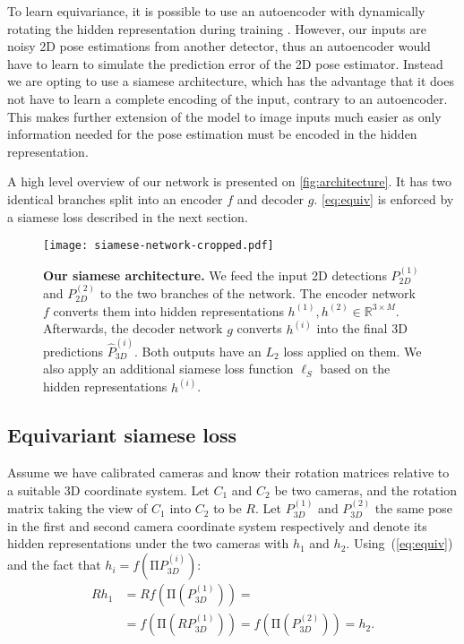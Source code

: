 \documentclass[preprint]{elsarticle}
\begin{document}
To learn equivariance, it is possible to use an autoencoder with dynamically rotating the hidden representation during training \cite{helge_geometry-aware}. However, our inputs are noisy 2D pose estimations from another detector, thus an autoencoder would have to learn to simulate the prediction error of the 2D pose estimator. Instead we are opting to use a siamese architecture, which has the advantage that it does not have to learn a complete encoding of the input, contrary to an autoencoder. This makes further extension of the model to image inputs much easier as only information needed for the pose estimation must be encoded in the hidden representation. 

A high level overview of our network is presented on \autoref{fig:architecture}. It has two identical branches split into an encoder $f$ and decoder $g$. \autoref{eq:equiv} is enforced by a siamese loss described in the next section. 

\begin{figure}[ht]
    \centering
    \texttt{[image: siamese-network-cropped.pdf]}
    \caption{\textbf{Our siamese architecture.} We feed the input 2D detections $P_{2D}^{(1)}$ and $P_{2D}^{(2)}$ to the two branches of the network. The encoder network $f$ converts them into hidden representations $h^{(1)},h^{(2)}\in\mathbb{R}^{3\times M}$. Afterwards, the decoder network $g$ converts $h^{(i)}$ into the final 3D predictions $\hat{P}_{3D}^{(i)}$. Both outputs have an $L_2$ loss applied on them. We also apply an additional siamese loss function $\ell_S$ based on the hidden representations $h^{(i)}$.}
    \label{fig:architecture}
\end{figure}

\subsection{Equivariant siamese loss}
Assume we have calibrated cameras and know their rotation matrices relative to a suitable 3D coordinate system. Let $C_1$ and $C_2$ be two cameras, and the rotation matrix taking the view of $C_1$ into $C_2$ to be $R$. Let $P_{3D}^{(1)}$ and $P_{3D}^{(2)}$ the same pose in the first and second camera coordinate system respectively and denote its hidden representations under the two cameras with $h_1$ and $h_2$. Using~(\ref{eq:equiv}) and the fact that $h_i=f\left(\mathrm{\Pi} P_{3D}^{(i)}\right)$:
\begin{equation}
\begin{split}
\label{eq:hidden}
    Rh_1&=Rf\left(\mathrm{\Pi} \left(P_{3D}^{(1)}\right)\right)= \\
   & =f\left(\mathrm{\Pi} \left(RP_{3D}^{(1)}\right)\right)=f\left(\mathrm{\Pi} \left(P_{3D}^{(2)}\right)\right)=h_2.
\end{split}
\end{equation}
\end{document}
